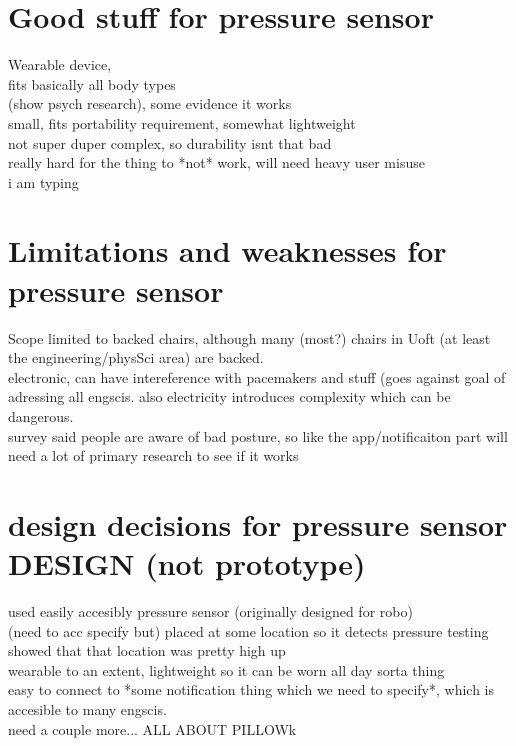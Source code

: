 \documentclass[11pt]{article}
\begin{document}
\section{Good stuff for pressure sensor}
Wearable device,\\
fits basically all body types\\
(show psych research), some evidence it works\\
small, fits portability requirement, somewhat lightweight\\
not super duper complex, so durability isnt that bad\\
really hard for the thing to *not* work, will need heavy user misuse\\
i am typing 
\section{Limitations and weaknesses for pressure sensor} %
Scope limited to backed chairs, although many (most?) chairs in Uoft (at least the engineering/physSci area) are backed. \\
electronic, can have intereference with pacemakers and stuff (goes against goal of adressing all engscis. also electricity introduces complexity which can be dangerous.\\
survey said people are aware of bad posture, so like the app/notificaiton part will need a lot of primary research to see if it works
\section{design decisions for pressure sensor DESIGN (not prototype)}
used easily accesibly pressure sensor (originally designed for robo)\\
(need to acc specify but) placed at some location so it detects pressure
testing showed that that location was pretty high up\\
wearable to an extent, lightweight so it can be worn all day sorta thing\\
easy to connect to *some notification thing which we need to specify*, which is accesible to many engscis.\\
need a couple more...
ALL ABOUT PILLOWk
\end{document}
